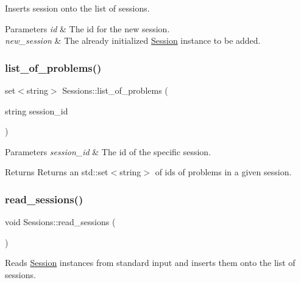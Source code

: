 Inserts session onto the list of sessions. 
\begin{DoxyParams}{Parameters}
{\em id} & The id for the new session. \\
\hline
{\em new\+\_\+session} & The already initialized \hyperlink{classSession}{Session} instance to be added. \\
\hline
\end{DoxyParams}
\mbox{\label{classSessions_a718f8c6c45ba188c3223334a6b636c96}} 
\subsubsection{\texorpdfstring{list\+\_\+of\+\_\+problems()}{list\_of\_problems()}}
{\footnotesize\ttfamily set$<$string$>$ Sessions\+::list\+\_\+of\+\_\+problems (\begin{DoxyParamCaption}\item[{string}]{session\+\_\+id }\end{DoxyParamCaption})}


\begin{DoxyParams}{Parameters}
{\em session\+\_\+id} & The id of the specific session. \\
\hline
\end{DoxyParams}
\begin{DoxyReturn}{Returns}
Returns an std\+::set$<$string$>$ of ids of problems in a given session. 
\end{DoxyReturn}
\mbox{\label{classSessions_ad64feefd5a922b325e3e58d2462a5c4d}} 
\subsubsection{\texorpdfstring{read\+\_\+sessions()}{read\_sessions()}}
{\footnotesize\ttfamily void Sessions\+::read\+\_\+sessions (\begin{DoxyParamCaption}{ }\end{DoxyParamCaption})}

Reads \hyperlink{classSession}{Session} instances from standard input and inserts them onto the list of sessions. \mbox{\label{classSessions_a997503177f5cde1a81668df6dfbc64a8}} 
